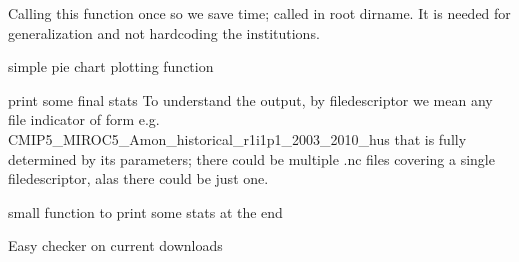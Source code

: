 \documentclass[letterpaper,10pt,english]{sphinxmanual}
\begin{document}

\begin{fulllineitems}
\label{\detokenize{index:cmip5datafinder.lsladir}}
Calling this function once so we save time; called in root dirname.
It is needed for generalization and not hardcoding the institutions.

\end{fulllineitems}


\begin{fulllineitems}
\label{\detokenize{index:cmip5datafinder.plotter}}
simple pie chart plotting function

\end{fulllineitems}


\begin{fulllineitems}
\label{\detokenize{index:cmip5datafinder.print_final_stats}}
print some final stats
To understand the output, by filedescriptor we mean any file indicator
of form e.g. CMIP5\_MIROC5\_Amon\_historical\_r1i1p1\_2003\_2010\_hus that is fully
determined by its parameters; there could be multiple .nc files
covering a single filedescriptor, alas there could be just one.

\end{fulllineitems}


\begin{fulllineitems}
\label{\detokenize{index:cmip5datafinder.print_stats}}
small function to print some stats at the end

\end{fulllineitems}


\begin{fulllineitems}
\label{\detokenize{index:cmip5datafinder.synda_check_dll}}
Easy checker on current downloads

\end{fulllineitems}
\end{document}
